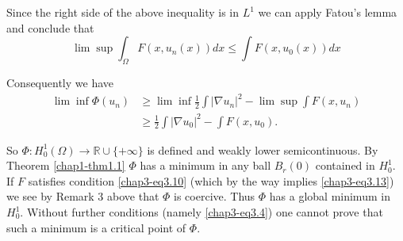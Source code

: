 Since the right side of the above inequality is in $L^{1}$ we can
apply Fatou's lemma and conclude that
$$
\lim\sup \int_{\Omega}F(x,u_{n}(x))dx\leq \int F(x,u_{0}(x))dx
$$

Consequently we have
\begin{align*}
\lim\inf \Phi(u_{n}) &\geq \lim\inf \frac{1}{2}\int |\nabla
u_{n}|^{2}-\lim\sup \int F(x,u_{n})\\
&\geq \frac{1}{2}\int|\nabla u_{0}|^{2}-\int F(x,u_{0}).
\end{align*}

So $\Phi:H^{1}_{0}(\Omega)\to \mathbb{R}\cup \{+\infty\}$ is defined
and weakly lower semicontinuous. By Theorem \ref{chap1-thm1.1} $\Phi$
has a minimum in any ball $B_{r}(0)$ contained in $H^{1}_{0}$. If $F$
satisfies condition \eqref{chap3-eq3.10} (which by the way implies
\eqref{chap3-eq3.13}) we see by Remark 3 above that $\Phi$ is
coercive. Thus $\Phi$ has a global minimum in $H^{1}_{0}$. Without
further conditions (namely \eqref{chap3-eq3.4}) one cannot prove that
such a minimum is a critical point of $\Phi$. 


